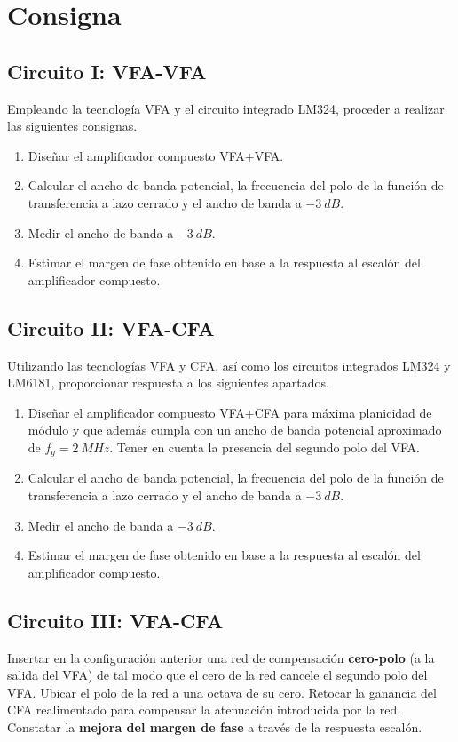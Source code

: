 \documentclass[12pt,A4paper,titlepage]{article}
\begin{document}
\newpage
\section{Consigna}
\subsection{Circuito I: VFA-VFA}
\hspace{1mm} Empleando la tecnología VFA y el circuito integrado LM324, proceder a realizar las siguientes consignas.
\begin{enumerate}[itemsep=1pt, label=\alph*.] 
    \item Diseñar el amplificador compuesto VFA+VFA.
    \item Calcular el ancho de banda potencial, la frecuencia del polo de la función de transferencia a lazo cerrado y el ancho de banda a \(-3~dB\).
     \item Medir el ancho de banda a \(-3~dB\).
     \item Estimar el margen de fase obtenido en base a la respuesta al escalón del amplificador compuesto.
\end{enumerate}

\subsection{Circuito II: VFA-CFA}
\hspace{1mm} Utilizando las tecnologías VFA y CFA, así como los circuitos integrados LM324 y LM6181, proporcionar respuesta a los siguientes apartados.
\begin{enumerate}[itemsep = 1pt, label=\alph*.]
    \item Diseñar el amplificador compuesto VFA+CFA para máxima planicidad de módulo y que además cumpla con un ancho de banda potencial aproximado de \(f_g=2~MHz\). Tener en cuenta la presencia del segundo polo del VFA.
    \item Calcular el ancho de banda potencial, la frecuencia del polo de la función de transferencia a lazo cerrado y el ancho de banda a \(-3~dB\).
    \item Medir el ancho de banda a \(-3~dB\).
    \item Estimar el margen de fase obtenido en base a la respuesta al escalón del amplificador compuesto.
\end{enumerate}

\subsection{Circuito III: VFA-CFA}
\hspace{1mm} Insertar en la configuración anterior una red de compensación \textbf{cero-polo} (a la salida del VFA) de tal modo que el cero de la red cancele el segundo polo del VFA. Ubicar el polo de la red a una octava de su cero. Retocar la ganancia del CFA realimentado para compensar la atenuación introducida por la red. Constatar la \textbf{mejora del margen de fase} a través de la respuesta escalón. 
\end{document}
